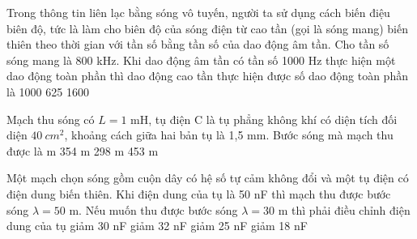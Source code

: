 \begin{vidu} %
 Trong thông tin liên lạc bằng sóng vô tuyến, người ta sử dụng cách biến điệu biên độ, tức là làm cho biên độ của sóng điện từ cao tần (gọi là sóng mang) biến thiên theo thời gian với tần số bằng tần số của dao động âm tần. Cho tần số sóng mang là 800 kHz. Khi dao động âm tần có tần số 1000 Hz thực hiện một dao động toàn phần thì dao động cao tần thực hiện được số dao động toàn phần là
\choice
{}
{1000}
{625}
{1600}
\end{vidu}
\begin{vidu} %
Mạch thu sóng có $L = 1$ mH, tụ điện C là tụ phẳng không khí có diện tích đối diện $40\ cm^2$, khoảng cách giữa hai bản tụ là 1,5 mm. Bước sóng mà mạch thu được là
\choice
{ m}
{354 m}
{298 m}
{453 m}
\end{vidu}
\begin{vidu} %
Một mạch chọn sóng gồm cuộn dây có hệ số tự cảm không đổi và một tụ điện có điện dung biến thiên. Khi điện dung của tụ là 50 nF thì mạch thu được bước sóng $\lambda  = 50$ m. Nếu muốn thu được bước sóng $\lambda  = 30$ m thì phải điều chỉnh điện dung của tụ
\choice
{giảm 30 nF}
{\True giảm 32 nF}
{giảm 25 nF}
{giảm 18 nF}
\end{vidu}
